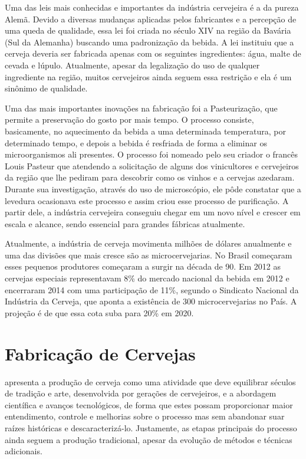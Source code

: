 Uma das leis mais conhecidas e importantes da indústria cervejeira é a da pureza Alemã. Devido a diversas mudanças aplicadas pelos fabricantes e a percepção de uma queda de qualidade, essa lei foi criada no século XIV na região da Bavária (Sul da Alemanha) buscando uma padronização da bebida. A lei instituiu que a cerveja deveria ser fabricada apenas com os seguintes ingredientes: água, malte de cevada e lúpulo. Atualmente, apesar da legalização do uso de qualquer ingrediente na região, muitos cervejeiros ainda seguem essa restrição e ela é um sinônimo de qualidade. 


Uma das mais importantes inovações na fabricação foi a Pasteurização, que permite a preservação do gosto por mais tempo. O processo consiste, basicamente, no aquecimento da bebida a uma determinada temperatura, por determinado tempo, e depois a bebida é resfriada de forma a eliminar os microorganismos ali presentes. O processo foi nomeado pelo seu criador o francês Louis Pasteur que atendendo a solicitação de alguns dos vinicultores e cervejeiros da região que lhe pediram para descobrir como os vinhos e a cervejas azedaram. Durante sua investigação, através do uso de microscópio, ele pôde constatar que a levedura ocasionava este processo e assim criou esse processo de purificação. A partir dele, a indústria cervejeira conseguiu chegar em um novo nível e crescer em escala e alcance, sendo essencial para grandes fábricas atualmente. 


Atualmente, a indústria de cerveja movimenta milhões de dólares anualmente e uma das divisões que mais cresce são as microcervejarias. No Brasil começaram esses pequenos produtores começaram a surgir na década de 90. Em 2012 as cervejas especiais representavam 8\% do mercado nacional da bebida em 2012 e encerraram 2014 com uma participação de 11\%, segundo o Sindicato Nacional da Indústria da Cerveja, que aponta a existência de 300 microcervejarias no País. A projeção é de que essa cota suba para 20\% em 2020.


\section{Fabricação de Cervejas}

 apresenta a produção de cerveja como uma atividade que deve equilibrar 
séculos de tradição e arte, desenvolvida por gerações de cervejeiros, e a abordagem científica 
e avanços tecnológicos, de forma que estes possam proporcionar maior entendimento, controle e melhorias 
sobre o processo mas sem abandonar suar raízes históricas e descaracterizá-lo. 
Justamente, as etapas principais do processo ainda seguem a produção tradicional, apesar
da evolução de métodos e técnicas adicionais.

